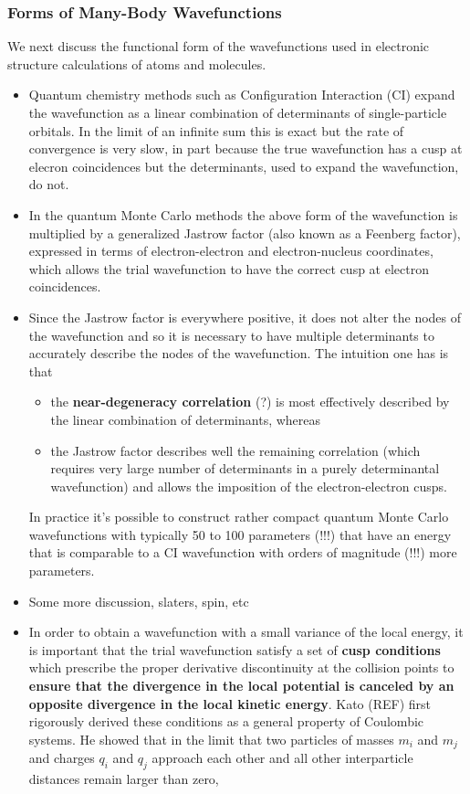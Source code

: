 \documentclass[twoside,english]{uiofysmaster}
\begin{document}
\subsubsection{Forms of Many-Body Wavefunctions}
We next discuss the functional form of the wavefunctions used in electronic structure calculations of atoms and molecules.
\begin{itemize}
	\item Quantum chemistry methods such as Configuration Interaction (CI) expand the wavefunction as a linear combination of determinants of single-particle orbitals. In the limit of an infinite sum this is exact but the rate of convergence is very slow, in part because the true wavefunction has a cusp at elecron coincidences but the determinants, used to expand the wavefunction, do not. 
	\item In the quantum Monte Carlo methods the above form of the wavefunction is multiplied by a generalized Jastrow factor (also known as a Feenberg factor), expressed in terms of electron-electron and electron-nucleus coordinates, which allows the trial wavefunction to have the correct cusp at electron coincidences. 
	\item Since the Jastrow factor is everywhere positive, it does not alter the nodes of the wavefunction and so it is necessary to have multiple determinants to accurately describe the nodes of the wavefunction. The intuition one has is that 
	\begin{itemize}
		\item the \textbf{near-degeneracy correlation} (?) is most effectively described by the linear combination of determinants, whereas 
		\item the Jastrow factor describes well the remaining correlation (which requires very large number of determinants in a purely determinantal wavefunction) and allows the imposition of the electron-electron cusps.
	\end{itemize}
	In practice it's possible to construct rather compact quantum Monte Carlo wavefunctions with typically 50 to 100 parameters (!!!) that have an energy that is comparable to a CI wavefunction with orders of magnitude (!!!) more parameters.
	\item Some more discussion, slaters, spin, etc
	\item In order to obtain a wavefunction with a small variance of the local energy, it is important that the trial wavefunction satisfy a set of \textbf{cusp conditions} which prescribe the proper derivative discontinuity at the collision points to \textbf{ensure that the divergence in the local potential is canceled by an opposite divergence in the local kinetic energy}. Kato (REF) first rigorously derived these conditions as a general property of Coulombic systems. He showed that in the limit that two particles of masses $m_i$ and $m_j$ and charges $q_i$ and $q_j$ approach each other and all other interparticle distances remain larger than zero,

\end{itemize}
\end{document}
